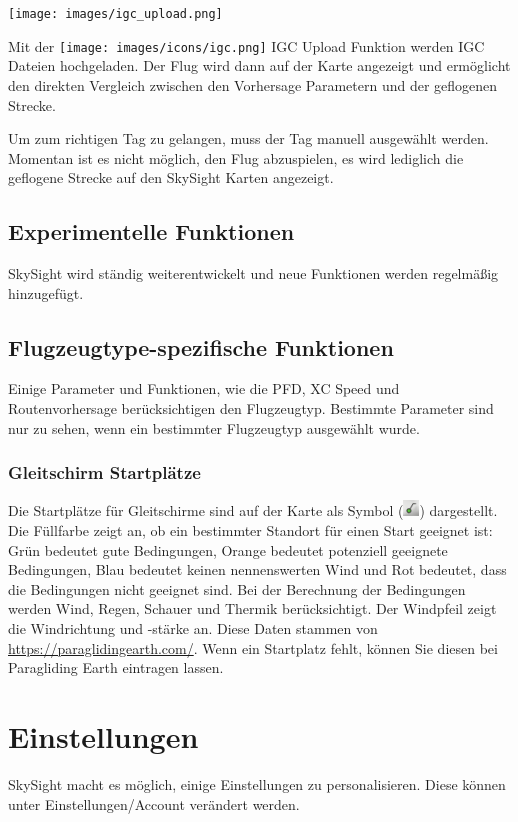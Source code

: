 \documentclass[11pt,a4paper]{article}
\begin{document}
\begin{center}
\texttt{[image: images/igc\_upload.png]}
\end{center}

Mit der \texttt{[image: images/icons/igc.png]} IGC Upload Funktion werden IGC Dateien hochgeladen. Der Flug wird dann auf der Karte angezeigt und ermöglicht den direkten Vergleich zwischen den Vorhersage Parametern und der geflogenen Strecke.

Um zum richtigen Tag zu gelangen, muss der Tag manuell ausgewählt werden. Momentan ist es nicht möglich, den Flug abzuspielen, es wird lediglich die geflogene Strecke auf den SkySight Karten angezeigt.

\subsection{Experimentelle Funktionen}
SkySight wird ständig weiterentwickelt und neue Funktionen werden regelmäßig hinzugefügt.

\subsection{Flugzeugtype-spezifische Funktionen}\label{subsec:specific_features}
Einige Parameter und Funktionen, wie die PFD, XC Speed und Routenvorhersage berücksichtigen den Flugzeugtyp. Bestimmte Parameter sind nur zu sehen, wenn ein bestimmter Flugzeugtyp ausgewählt wurde.
\subsubsection{Gleitschirm Startplätze}
Die Startplätze für Gleitschirme sind auf der Karte als Symbol (\includegraphics[height=12pt]{images/icons/paraglider_launch.png}) dargestellt. Die Füllfarbe zeigt an, ob ein bestimmter Standort für einen Start geeignet ist: Grün bedeutet gute Bedingungen, Orange bedeutet potenziell geeignete Bedingungen, Blau bedeutet keinen nennenswerten Wind und Rot bedeutet, dass die Bedingungen nicht geeignet sind. Bei der Berechnung der Bedingungen werden Wind, Regen, Schauer und Thermik berücksichtigt. Der Windpfeil zeigt die Windrichtung und -stärke an. Diese Daten stammen von \url{https://paraglidingearth.com/}. Wenn ein Startplatz fehlt, können Sie diesen bei Paragliding Earth eintragen lassen.

\section{Einstellungen}
SkySight macht es möglich, einige Einstellungen zu personalisieren. Diese können unter Einstellungen/Account verändert werden.
\end{document}
